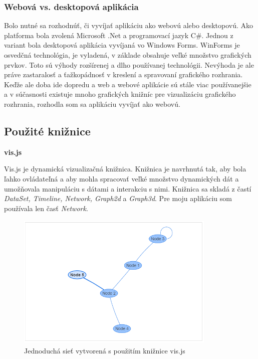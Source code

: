 \documentclass[slovak,master,public,dept460,male,cpdeclaration,oneside]{diploma}
\begin{document}
\subsubsection{Webová vs. desktopová aplikácia}
Bolo nutné sa rozhodnúť, či vyvíjať aplikáciu ako webovú alebo desktopovú. Ako platforma bola zvolená Microsoft .Net a programovací jazyk C\#. Jednou z variant bola desktopová aplikácia vyvíjaná vo Windows Forms. WinForms je osvedčná technológia, je vyladená, v základe obsahuje veľké množstvo grafických prvkov. Toto sú výhody rozšírenej a dlho používanej technológii. Nevýhoda je ale práve zastaralosť a ťažkopádnosť v kreslení a spravovaní grafického rozhrania. Keďže ale doba ide dopredu a web a webové aplikácie sú stále viac používanejšie a v súčasnosti existuje mnoho grafických knižníc pre vizualizáciu grafického rozhrania, rozhodla som sa aplikáciu vyvíjať ako webovú.


\subsection{Použité knižnice}


\textbf{vis.js}


\noindent Vis.js je dynamická vizualizačná knižnica. Knižnica je navrhnutá tak, aby bola ľahko ovládateľná a aby mohla spracovať veľké množstvo dynamických dát a umožňovala manipuláciu s dátami a interakciu s nimi. Knižnica sa skladá z častí \textit{DataSet, Timeline, Network, Graph2d} a \textit{Graph3d}.
Pre moju aplikáciu som používala len časť \textit{Network}.

\begin{figure}[H]
\centering
\includegraphics[width=9.5cm, height=6.5cm]{figures/vis_basic_usage}
\caption{Jednoduchá sieť vytvorená s použitím knižnice vis.js}
\end{figure}
\end{document}
